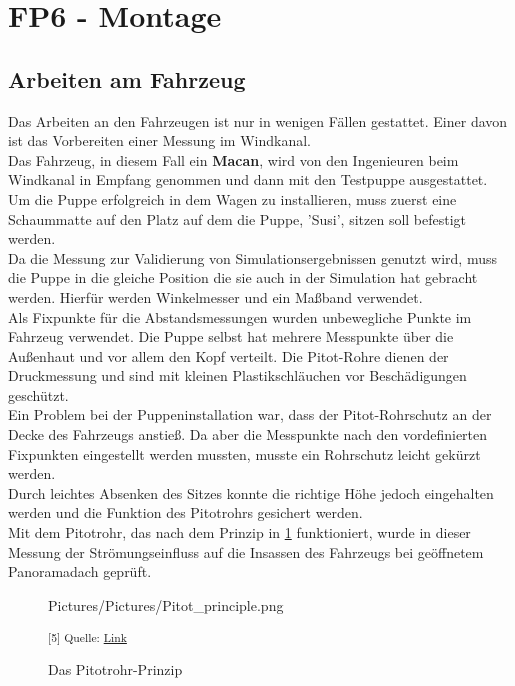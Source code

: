 \newpage
\section{FP6 - Montage}

\subsection{Arbeiten am Fahrzeug}

Das Arbeiten an den Fahrzeugen ist nur in wenigen Fällen gestattet. Einer davon ist das Vorbereiten einer Messung im Windkanal. \\

Das Fahrzeug, in diesem Fall ein \textbf{Macan},  wird von den Ingenieuren beim Windkanal in Empfang genommen und dann mit den Testpuppe ausgestattet. \\

Um die Puppe erfolgreich in dem Wagen zu installieren, muss zuerst eine Schaummatte auf den Platz auf dem die Puppe, 'Susi', sitzen soll befestigt werden. \\
Da die Messung zur Validierung von Simulationsergebnissen genutzt wird, muss die Puppe in die gleiche Position die sie auch in der Simulation hat gebracht werden. Hierfür werden Winkelmesser und ein Maßband verwendet. \\
Als Fixpunkte für die Abstandsmessungen wurden unbewegliche Punkte im Fahrzeug verwendet. Die Puppe selbst hat mehrere Messpunkte über die Außenhaut und vor allem den Kopf verteilt. Die Pitot-Rohre dienen der Druckmessung und sind mit kleinen Plastikschläuchen vor Beschädigungen geschützt. \\
Ein Problem bei der Puppeninstallation war, dass der Pitot-Rohrschutz an der Decke des Fahrzeugs anstieß. Da aber die Messpunkte nach den vordefinierten Fixpunkten eingestellt werden mussten, musste ein Rohrschutz leicht gekürzt werden. \\
Durch leichtes Absenken des Sitzes konnte die richtige Höhe jedoch eingehalten werden und die Funktion des Pitotrohrs gesichert werden.\\

Mit dem Pitotrohr, das nach dem Prinzip in \ref{Pitot} funktioniert, wurde in dieser Messung der Strömungseinfluss auf die Insassen des Fahrzeugs bei geöffnetem Panoramadach geprüft. 

\begin{figure}[H]
	\begin{center}
		\begin{overpic}[width=\linewidth]{Pictures/Pictures/Pitot_principle.png}
			
		\end{overpic}
		
		\label{Pitot}
		\caption{Das Pitotrohr-Prinzip}
		\small\textsuperscript{[5] Quelle: \href{https://www.wikiwand.com/de/Pitotrohr}{Link}}
	\end{center}
\end{figure} 
